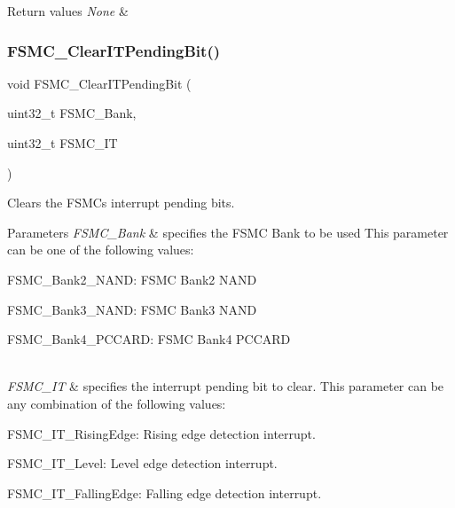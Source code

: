 \begin{DoxyRetVals}{Return values}
{\em None} & \\
\hline
\end{DoxyRetVals}
\mbox{\label{group___f_s_m_c___private___functions_gad9387e7674b8a376256a3378649e004e}} 
\subsubsection{\texorpdfstring{FSMC\_ClearITPendingBit()}{FSMC\_ClearITPendingBit()}}
{\footnotesize\ttfamily void F\+S\+M\+C\+\_\+\+Clear\+I\+T\+Pending\+Bit (\begin{DoxyParamCaption}\item[{uint32\+\_\+t}]{F\+S\+M\+C\+\_\+\+Bank,  }\item[{uint32\+\_\+t}]{F\+S\+M\+C\+\_\+\+IT }\end{DoxyParamCaption})}



Clears the F\+S\+MC\textquotesingle{}s interrupt pending bits. 


\begin{DoxyParams}{Parameters}
{\em F\+S\+M\+C\+\_\+\+Bank} & specifies the F\+S\+MC Bank to be used This parameter can be one of the following values\+: \begin{DoxyItemize}
\item F\+S\+M\+C\+\_\+\+Bank2\+\_\+\+N\+A\+ND\+: F\+S\+MC Bank2 N\+A\+ND \item F\+S\+M\+C\+\_\+\+Bank3\+\_\+\+N\+A\+ND\+: F\+S\+MC Bank3 N\+A\+ND \item F\+S\+M\+C\+\_\+\+Bank4\+\_\+\+P\+C\+C\+A\+RD\+: F\+S\+MC Bank4 P\+C\+C\+A\+RD \end{DoxyItemize}
\\
\hline
{\em F\+S\+M\+C\+\_\+\+IT} & specifies the interrupt pending bit to clear. This parameter can be any combination of the following values\+: \begin{DoxyItemize}
\item F\+S\+M\+C\+\_\+\+I\+T\+\_\+\+Rising\+Edge\+: Rising edge detection interrupt. \item F\+S\+M\+C\+\_\+\+I\+T\+\_\+\+Level\+: Level edge detection interrupt. \item F\+S\+M\+C\+\_\+\+I\+T\+\_\+\+Falling\+Edge\+: Falling edge detection interrupt. \end{DoxyItemize}
\\
\hline
\end{DoxyParams}

